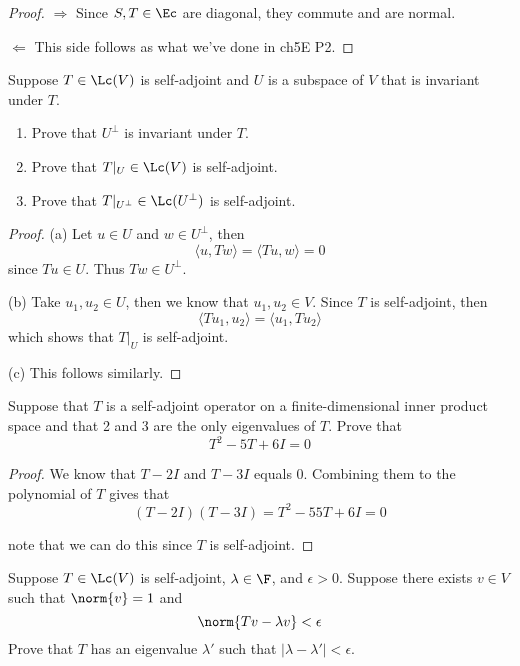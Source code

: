 \documentclass{extarticle}
\begin{document}
\begin{proof}
\(\Rightarrow\) Since \(S, T \in \Ec\) are diagonal, they commute and are normal.

\(\Leftarrow\) This side follows as what we've done in ch5E P2.
\end{proof}

\begin{problem}{19}
    Suppose \(T \in \Lc(V)\) is self-adjoint and \(U\) is a subspace of \(V\) that is invariant
    under \(T\).
    \begin{enumerate}[label=(\alph*)]
        \item Prove that \(U^\perp\) is invariant under \(T\).
        \item Prove that \(T|_U \in \Lc(V)\) is self-adjoint.
        \item Prove that \(T |_{U^\perp} \in \Lc(U^\perp)\) is self-adjoint.
    \end{enumerate}
\end{problem}

\begin{proof}
(a) Let \(u \in U\) and \(w \in U^\perp\), then
\[\langle u,Tw \rangle = \langle Tu,w \rangle = 0\]
since \(Tu \in U\). Thus \(Tw \in U^\perp\).

(b) Take \(u_1, u_2 \in U\), then we know that \(u_1, u_2 \in V\). Since \(T\) is self-adjoint, then
\[\langle Tu_1, u_2 \rangle = \langle u_1,Tu_2 \rangle\]
which shows that \(T|_U\) is self-adjoint.

(c) This follows similarly.
\end{proof}

\begin{problem}{21}
    Suppose that \(T\) is a self-adjoint operator on a finite-dimensional inner product space and
    that 2 and 3 are the only eigenvalues of \(T\). Prove that
    \[T^2 - 5T + 6I = 0\]
\end{problem}

\begin{proof}
We know that \(T - 2I\) and \(T - 3I\) equals 0. Combining them to the polynomial of \(T\) gives that
\[(T - 2I)(T - 3I) = T^2 - 55T + 6I = 0\]

note that we can do this since \(T\) is self-adjoint.
\end{proof}

\begin{problem}{23}
    Suppose \(T \in \Lc(V)\) is self-adjoint, \(\lambda \in \F\), and \(\epsilon > 0\). Suppose there
    exists \(v \in V\) such that \(\norm{v} = 1\) and
    \[\norm{Tv - \lambda v} < \epsilon\]
    Prove that \(T\) has an eigenvalue \(\lambda'\) such that \(|\lambda - \lambda'| < \epsilon\).
\end{problem}
\end{document}
